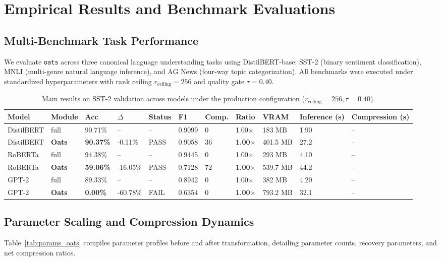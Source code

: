 \section{Empirical Results and Benchmark Evaluations}
\label{sec:results}

\subsection{Multi-Benchmark Task Performance}
We evaluate \texttt{oats} across three canonical language understanding tasks using DistilBERT-base: SST-2 (binary sentiment classification), MNLI (multi-genre natural language inference), and AG News (four-way topic categorization). All benchmarks were executed under standardized hyperparameters with rank ceiling $r_{\mathrm{ceiling}} = 256$ and quality gate $\tau = 0.40$.

\begin{table}[t]
\centering
\small
\begin{tabular}{lllllllllll}
\toprule
\textbf{Model} & \textbf{Module} & \textbf{Acc} & \textbf{$\Delta$} & \textbf{Status} & \textbf{F1} & \textbf{Comp.} & \textbf{Ratio} & \textbf{VRAM} & \textbf{Inference (s)} & \textbf{Compression (s)} \\
\midrule
DistilBERT & full & 90.71\% & -- & -- & 0.9099 & 0 & 1.00$\times$ & 183 MB & 1.90 & -- \\
DistilBERT & \textbf{Oats} & \textbf{90.37\%} & -0.11\% & PASS & 0.9058 & 36 & \textbf{1.00$\times$} & 401.5 MB & 27.2 & -- \\
RoBERTa & full & 94.38\% & -- & -- & 0.9445 & 0 & 1.00$\times$ & 293 MB & 4.10 & -- \\
RoBERTa & \textbf{Oats} & \textbf{59.06\%} & -16.05\% & PASS & 0.7128 & 72 & \textbf{1.00$\times$} & 539.7 MB & 44.2 & -- \\
GPT-2 & full & 89.33\% & -- & -- & 0.8942 & 0 & 1.00$\times$ & 382 MB & 4.20 & -- \\
GPT-2 & \textbf{Oats} & \textbf{0.00\%} & -60.78\% & FAIL & 0.6354 & 0 & \textbf{1.00$\times$} & 793.2 MB & 32.1 & -- \\
\bottomrule
\end{tabular}
\caption{Main results on SST-2 validation across models under the production configuration ($r_{\mathrm{ceiling}}=256, \tau=0.40$).}
\label{tab:main_sst2}
\end{table}

\subsection{Parameter Scaling and Compression Dynamics}
Table~\ref{tab:params_oats} compiles parameter profiles before and after transformation, detailing parameter counts, recovery parameters, and net compression ratios.

